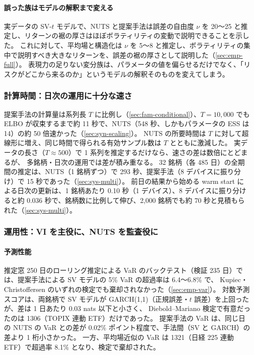 \paragraph{誤った族はモデルの解釈まで変える}
実データの SV-$t$ モデルで、NUTS と提案手法は誤差の自由度 $\nu$ を 20〜25 と推定し、リターンの裾の厚さはほぼボラティリティの変動で説明できることを示した。
これに対して、平均場と構造化は $\nu$ を 5〜8 と推定し、ボラティリティの集中で説明すべき大きなリターンを、誤差の裾の厚さとして説明した（\cref{sec:emp-full}）。
表現力の足りない変分族は、パラメータの値を偏らせるだけでなく、「リスクがどこから来るのか」というモデルの解釈そのものを変えてしまう。

\subsubsection{計算時間：日次の運用に十分な速さ}

提案手法の計算量は系列長 $T$ に比例し（\cref{sec:fam-conditional}）、$T = 10{,}000$ でも ELBO が収束するまで約 11 秒で、NUTS（548 秒、しかもパラメータの ESS は 14）の約 50 倍速かった（\cref{sec:syn-scaling}）。
NUTS の所要時間は $T$ に対して超線形に増え、同じ時間で得られる有効サンプル数は $T$ とともに激減した。
実データの長さ（$T \approx 500$）で 1 系列を推定するだけなら、速さの差は数倍にとどまるが、
多銘柄・日次の運用では差が積み重なる。
32 銘柄（各 485 日）の全期間の推定は、NUTS（1 銘柄ずつ）で 293 秒、提案手法（8 デバイスに振り分け）で 15 秒であった（\cref{sec:sys-multi}）。
前日の結果から始める warm start による日次の更新は、1 銘柄あたり 0.10 秒（1 デバイス）、8 デバイスに振り分けると約 0.036 秒で、銘柄数に比例して伸び、2,000 銘柄でも約 70 秒と見積もられた（\cref{sec:sys-multi}）。

\subsubsection{運用性：VI を主役に、NUTS を監査役に}

\paragraph{予測性能}
推定窓 250 日のローリング推定による VaR のバックテスト（検証 235 日）では、提案手法による SV モデルの 5\% VaR の超過率は 6.4〜6.8\% で、
Kupiec・Christoffersen のいずれの検定でも棄却されなかった（\cref{sec:emp-var}）。
対数予測スコアは、両銘柄で SV モデルが GARCH(1,1)（正規誤差・$t$ 誤差）を上回ったが、差は 1 日あたり 0.03 nats 以下と小さく、
Diebold–Mariano 検定で有意だったのは 1306（TOPIX 連動 ETF）だけであった。
提案手法の VaR は、同じ日の NUTS の VaR との差が 0.02\% ポイント程度で、手法間（SV と GARCH）の差より 1 桁小さかった。
一方、平均場近似の VaR は 1321（日経 225 連動 ETF）で超過率 8.1\% となり、検定で棄却された。

